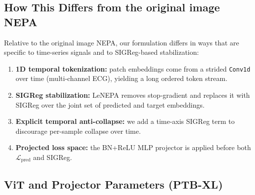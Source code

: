 \subsection{How This Differs from the original image NEPA}
\label{sec:appendix_nepa_vs_vision}

Relative to the original image NEPA, our formulation differs in ways that are specific to time-series signals and to SIGReg-based stabilization:
\begin{enumerate}
  \item \textbf{1D temporal tokenization:} patch embeddings come from a strided \texttt{Conv1d} over time (multi-channel ECG), yielding a long ordered token stream.
  \item \textbf{SIGReg stabilization:} LeNEPA removes stop-gradient and replaces it with SIGReg over the joint set of predicted and target embeddings.
  \item \textbf{Explicit temporal anti-collapse:} we add a time-axis SIGReg term to discourage per-sample collapse over time.
  \item \textbf{Projected loss space:} the BN+ReLU MLP projector is applied before both $\mathcal{L}_{\text{pred}}$ and SIGReg.
\end{enumerate}

\subsection{ViT and Projector Parameters (PTB-XL)}
\label{sec:appendix_ptbxl_params}


